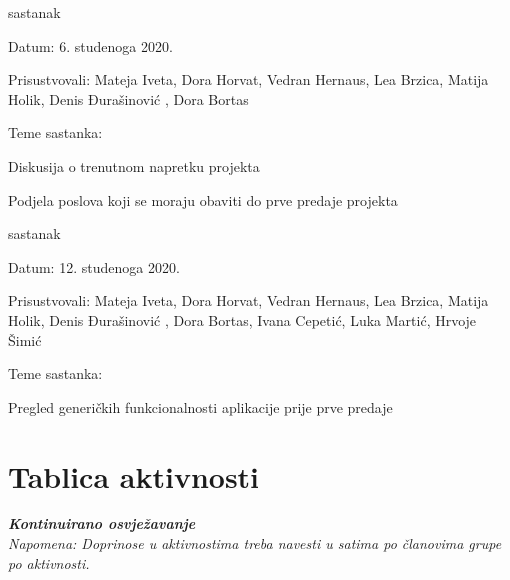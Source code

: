 \begin{packed_enum}
\begin{packed_item}
\begin{packed_item}
			\end{packed_item}
		\end{packed_item}
	\item sastanak
		\item[] \begin{packed_item}
			\item Datum: 6. studenoga 2020.
			\item Prisustvovali: Mateja Iveta, Dora Horvat, Vedran Hernaus, Lea Brzica, Matija Holik, Denis Đurašinović , Dora Bortas
			\item Teme sastanka:
			\begin{packed_item}
				\item Diskusija o trenutnom napretku projekta
				\item Podjela poslova koji se moraju obaviti do prve predaje projekta
			\end{packed_item}
		\end{packed_item}
			\item sastanak
			\item[] \begin{packed_item}
				\item Datum: 12. studenoga 2020.
				\item Prisustvovali: Mateja Iveta, Dora Horvat, Vedran Hernaus, Lea Brzica, Matija Holik, Denis Đurašinović , Dora Bortas, Ivana Cepetić, Luka Martić, Hrvoje Šimić
				\item Teme sastanka:
				\begin{packed_item}
					\item Pregled generičkih funkcionalnosti aplikacije prije prve predaje
				\end{packed_item}
			\end{packed_item}
			
		\end{packed_enum}
		
		\eject
		\section*{Tablica aktivnosti}
		
			\textbf{\textit{Kontinuirano osvježavanje}}\\
			
			 \textit{Napomena: Doprinose u aktivnostima treba navesti u satima po članovima grupe po aktivnosti.}
					
						
			
